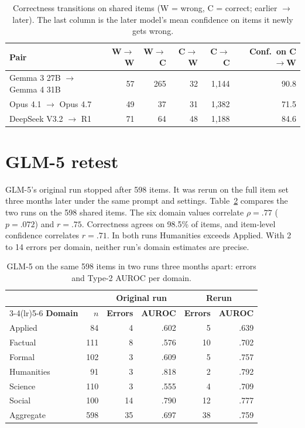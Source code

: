 \begin{table}[!htbp]
\centering
\caption{Correctness transitions on shared items (W = wrong, C = correct; earlier $\to$ later). The last column is the later model's mean confidence on items it newly gets wrong.}
\label{tab:transitions}
\small
\begin{tabular}{lrrrrr}
\toprule
\textbf{Pair} & \textbf{W$\to$W} & \textbf{W$\to$C} & \textbf{C$\to$W} & \textbf{C$\to$C} & \textbf{Conf.\ on C$\to$W} \\
\midrule
Gemma 3 27B $\to$ Gemma 4 31B & 57 & 265 & 32 & 1{,}144 & 90.8 \\
Opus 4.1 $\to$ Opus 4.7 & 49 & 37 & 31 & 1{,}382 & 71.5 \\
DeepSeek V3.2 $\to$ R1 & 71 & 64 & 48 & 1{,}188 & 84.6 \\
\bottomrule
\end{tabular}
\end{table}

\section{GLM-5 retest}
\label{app:glm5}

GLM-5's original run stopped after 598 items. It was rerun on the full item set three months later under the same prompt and settings. Table~\ref{tab:glm5} compares the two runs on the 598 shared items. The six domain values correlate $\rho = .77$ ($p = .072$) and $r = .75$. Correctness agrees on 98.5\% of items, and item-level confidence correlates $r = .71$. In both runs Humanities exceeds Applied. With 2 to 14 errors per domain, neither run's domain estimates are precise.

\begin{table}[!htbp]
\centering
\caption{GLM-5 on the same 598 items in two runs three months apart: errors and Type-2 AUROC per domain.}
\label{tab:glm5}
\small
\begin{tabular}{lrrrrr}
\toprule
& & \multicolumn{2}{c}{\textbf{Original run}} & \multicolumn{2}{c}{\textbf{Rerun}} \\
\cmidrule(lr){3-4}\cmidrule(lr){5-6}
\textbf{Domain} & \textbf{$n$} & \textbf{Errors} & \textbf{AUROC} & \textbf{Errors} & \textbf{AUROC} \\
\midrule
Applied & 84 & 4 & .602 & 5 & .639 \\
Factual & 111 & 8 & .576 & 10 & .702 \\
Formal & 102 & 3 & .609 & 5 & .757 \\
Humanities & 91 & 3 & .818 & 2 & .792 \\
Science & 110 & 3 & .555 & 4 & .709 \\
Social & 100 & 14 & .790 & 12 & .777 \\
\midrule
Aggregate & 598 & 35 & .697 & 38 & .759 \\
\bottomrule
\end{tabular}
\end{table}


